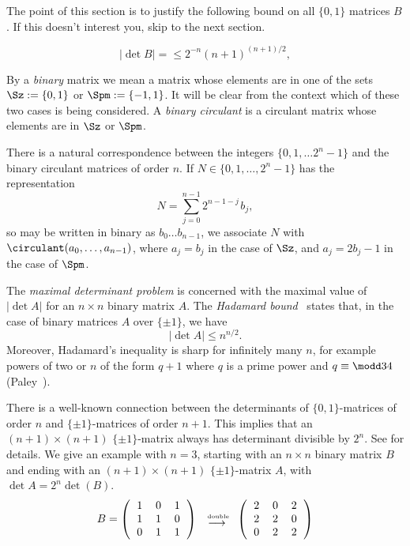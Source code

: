 The point of this section is to justify the following bound on all $\{0, 1\}$ matrices $B$. If this doesn't interest you, skip to the next section.

\begin{equation}
|\det B| = \le 2^{-n}(n+1)^{(n+1)/2},	\label{eq:Hadamard0}
\end{equation}


By a \emph{binary} matrix we mean a matrix whose elements are in one of the
sets $\Sz := \{0,1\}$ or $\Spm := \{-1,1\}$. It will be clear from
the context which of these two cases is being considered.
A \emph{binary circulant} is a circulant matrix whose
elements are in $\Sz$ or $\Spm$.

There is a natural %
correspondence between the integers
\hbox{$\{0,1,\ldots 2^n-1\}$} and the binary circulant matrices of order
$n$.  If $N\in \{0,1,\ldots,2^n-1\}$ has the representation
\[N = \sum_{j=0}^{n-1} 2^{n-1-j\,}b_j,\]
so may be written in binary as $b_0 \ldots b_{n-1}$,
we associate $N$ with
$\circulant(a_0,\ldots,a_{n-1})$,
where $a_j = b_j$ in the case of $\Sz$, and $a_j = 2b_j-1$ in
the case of $\Spm$.

The \emph{maximal determinant problem} is concerned with the maximal value
of $|\det A|$ for an $n\times n$ binary matrix $A$. 
The \emph{Hadamard bound}~\cite{Hadamard93} states that, in the case of
binary matrices $A$ over $\{\pm1\}$, we have 
\begin{equation}
|\det A| \le n^{n/2}.					\label{eq:Hadamard1}
\end{equation}
Moreover, Hadamard's inequality is sharp for infinitely many $n$, for
example powers of two 
or $n$ of the form
$q+1$ where $q$ is a prime power and 
$q \equiv \modd 3 4$ (Paley~\cite{Paley33}).

There is a well-known 
connection between the determinants of
$\{0,1\}$-matrices of order $n$ and
$\{\pm1\}$-matrices of order $n+1$.
This implies that an $(n+1)\times (n+1)$ $ \{\pm1\}$-matrix 
always has determinant divisible
by $ 2^{n}$.
See \cite{Neubauer97} %
for details.
We give an example with $n=3$, starting with an $n\times n$ binary
matrix $B$ and ending with an $(n+1)\times(n+1)$ $\{\pm1\}$-matrix $A$,
with $\det A = 2^n\det(B)$.
\[
B = 
\left(\begin{tabular}{ccc}
$1$&$0$&$1$\\
$1$&$1$&$0$\\
$0$&$1$&$1$
\end{tabular}\right)
\begin{tabular}{c}
\begin{tiny}{ double}\end{tiny}\\[-5pt]
$\longrightarrow$
\end{tabular}
\left(\begin{tabular}{rrr}
$2$&$0$&$2$\\
$2$&$2$&$0$\\
$0$&$2$&$2$
\end{tabular}\right)
\]

